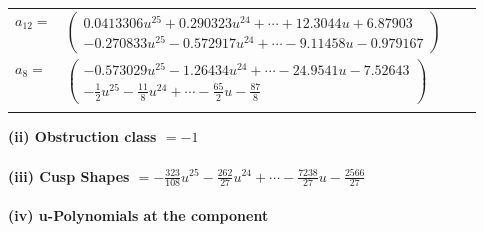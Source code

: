 \documentclass[1p]{elsarticle_modified}
\theoremstyle{definition}
\begin{document}
\begin{tabular}{m{7pt} m{180pt} m{7pt} m{180pt} }
\flushright $a_{12}=$&$\begin{pmatrix}0.0413306 u^{25}+0.290323 u^{24}+\cdots+12.3044 u+6.87903\\-0.270833 u^{25}-0.572917 u^{24}+\cdots-9.11458 u-0.979167\end{pmatrix}$ \\
\flushright $a_{8}=$&$\begin{pmatrix}-0.573029 u^{25}-1.26434 u^{24}+\cdots-24.9541 u-7.52643\\-\frac{1}{2} u^{25}-\frac{11}{8} u^{24}+\cdots-\frac{65}{2} u-\frac{87}{8}\end{pmatrix}$\\&\end{tabular}
\flushleft \textbf{(ii) Obstruction class $= -1$}\\~\\
\flushleft \textbf{(iii) Cusp Shapes $= -\frac{323}{108} u^{25}-\frac{262}{27} u^{24}+\cdots-\frac{7238}{27} u-\frac{2566}{27}$}\\~\\
\newpage\renewcommand{\arraystretch}{1}
\flushleft \textbf{(iv) u-Polynomials at the component}\newline \\
\end{document}
